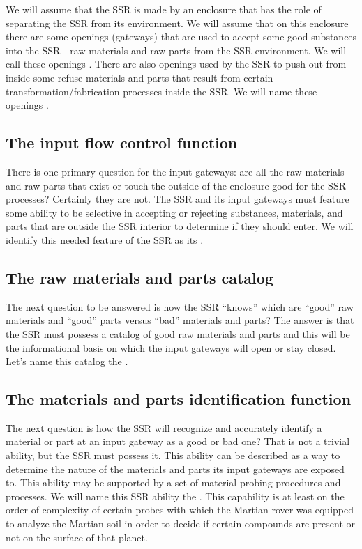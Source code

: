 We will assume that the SSR is
made by an enclosure that has the role of separating the SSR from its
environment. We will assume that on this enclosure there are some
openings (gateways) that are used to accept some good
substances into the SSR---raw materials and raw parts from the SSR environment. We
will call these openings . There are also
openings used by the SSR to push out from inside some refuse materials
and parts that result from certain transformation/fabrication processes
inside the SSR. We will name these openings .

\subsection[The input flow control function]{The input flow control
function}

There is one primary question
for the input gateways: are all the raw materials and raw parts that
exist or touch the outside of the enclosure good for the SSR processes?
Certainly they are not. The SSR and its input gateways must feature some
ability to be selective in accepting or rejecting substances, materials,
and parts that are outside the SSR interior to determine if they should enter. We will
identify this needed feature of the SSR as its .

\subsection[The raw materials and parts catalog]{The raw materials and
parts catalog}

The next question to be answered
is how the SSR “knows” which are “good” raw materials and “good” parts
versus “bad” materials and parts? The answer is that the SSR must
possess a catalog of good raw materials and parts and this will be the
informational basis on which the input gateways will open or stay
closed. Let’s name this catalog the .

\subsection[The materials and parts identification function]{The
materials and parts identification function}

The next question is how the SSR
will recognize and accurately identify a material or part at an input
gateway as a good or bad one? That is not a trivial ability, but the
SSR must possess it. This ability can be described as a way to
determine the nature of the materials and parts its input gateways are
exposed to. This ability may be supported by a set of material probing
procedures and processes. We will name this SSR ability the
. This capability
is at least on the order of complexity of certain probes with which the
Martian rover was equipped to analyze the Martian soil in order to
decide if certain compounds are present or not on the surface of that
planet.

